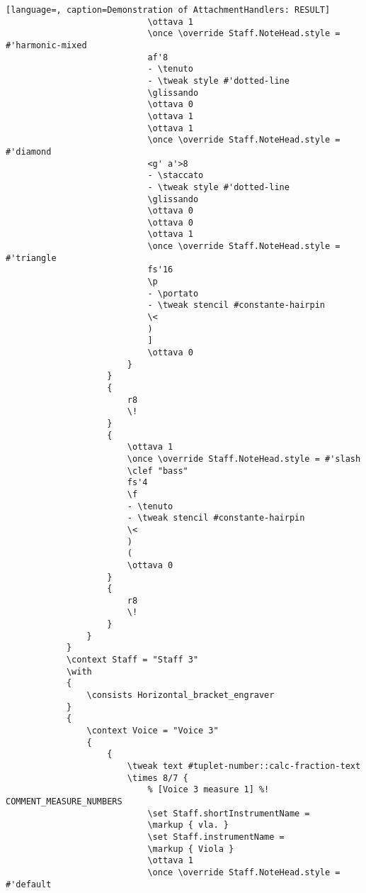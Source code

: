 \begin{lstlisting}[language=, caption=Demonstration of AttachmentHandlers: RESULT]
                            \ottava 1
                            \once \override Staff.NoteHead.style = #'harmonic-mixed
                            af'8
                            - \tenuto
                            - \tweak style #'dotted-line
                            \glissando
                            \ottava 0
                            \ottava 1
                            \ottava 1
                            \once \override Staff.NoteHead.style = #'diamond
                            <g' a'>8
                            - \staccato
                            - \tweak style #'dotted-line
                            \glissando
                            \ottava 0
                            \ottava 0
                            \ottava 1
                            \once \override Staff.NoteHead.style = #'triangle
                            fs'16
                            \p
                            - \portato
                            - \tweak stencil #constante-hairpin
                            \<
                            )
                            ]
                            \ottava 0
                        }
                    }
                    {
                        r8
                        \!
                    }
                    {
                        \ottava 1
                        \once \override Staff.NoteHead.style = #'slash
                        \clef "bass"
                        fs'4
                        \f
                        - \tenuto
                        - \tweak stencil #constante-hairpin
                        \<
                        )
                        (
                        \ottava 0
                    }
                    {
                        r8
                        \!
                    }
                }
            }
            \context Staff = "Staff 3"
            \with
            {
                \consists Horizontal_bracket_engraver
            }
            {
                \context Voice = "Voice 3"
                {
                    {
                        \tweak text #tuplet-number::calc-fraction-text
                        \times 8/7 {
                            % [Voice 3 measure 1] %! COMMENT_MEASURE_NUMBERS
                            \set Staff.shortInstrumentName =
                            \markup { vla. }
                            \set Staff.instrumentName =
                            \markup { Viola }
                            \ottava 1
                            \once \override Staff.NoteHead.style = #'default

\end{lstlisting}
